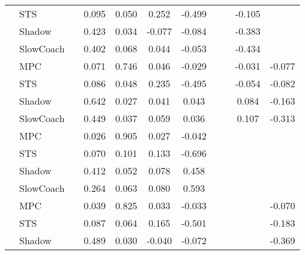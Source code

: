 \begin{tabular}{|l|l|*{9}{c|}}
                                                           & STS &       &     0.095 &     0.050 &  0.252 & -0.499 &     &      &  -0.105 &       \\
                                                           & Shadow &       &     0.423 &     0.034 & -0.077 & -0.084 &     &      &  -0.383 &       \\
                                                           & SlowCoach &       &     0.402 &     0.068 &  0.044 & -0.053 &     &      &  -0.434 &       \\
\midrule
[False, True, True, True, True, False, False, True, True] & MPC &       &     0.071 &     0.746 &  0.046 & -0.029 &     &      &  -0.031 &   -0.077 \\
                                                           & STS &       &     0.086 &     0.048 &  0.235 & -0.495 &     &      &  -0.054 &   -0.082 \\
                                                           & Shadow &       &     0.642 &     0.027 &  0.041 &  0.043 &     &      &   0.084 &   -0.163 \\
                                                           & SlowCoach &       &     0.449 &     0.037 &  0.059 &  0.036 &     &      &   0.107 &   -0.313 \\
\midrule
[False, True, True, True, True, False, False, False, False] & MPC &       &     0.026 &     0.905 &  0.027 & -0.042 &     &      &      &       \\
                                                           & STS &       &     0.070 &     0.101 &  0.133 & -0.696 &     &      &      &       \\
                                                           & Shadow &       &     0.412 &     0.052 &  0.078 &  0.458 &     &      &      &       \\
                                                           & SlowCoach &       &     0.264 &     0.063 &  0.080 &  0.593 &     &      &      &       \\
\midrule
[False, True, True, True, True, False, False, False, True] & MPC &       &     0.039 &     0.825 &  0.033 & -0.033 &     &      &      &   -0.070 \\
                                                           & STS &       &     0.087 &     0.064 &  0.165 & -0.501 &     &      &      &   -0.183 \\
                                                           & Shadow &       &     0.489 &     0.030 & -0.040 & -0.072 &     &      &      &   -0.369 \\

\end{tabular}
